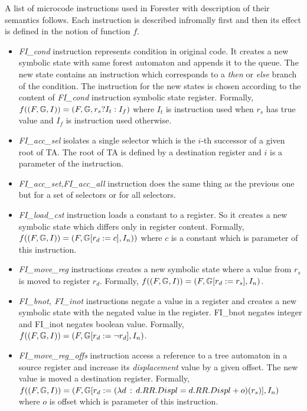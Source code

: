 A list of microcode instructions used in Forester with description
of their semantics follows.
Each instruction is described infromally first and then its effect is defined
in the notion of function $f$.
\begin{itemize}
	\item \emph{FI\_cond} instruction represents condition in original code.
		It creates a new symbolic state with same forest automaton and appends
		it to the queue.
		The new state contains an instruction which corresponds to a \textit{then}
		or \textit{else} branch of the condition.
		The instruction for the new states is chosen according to
		the content of \emph{FI\_cond} instruction symbolic state register.
		Formally, $f((F, \mathbb{G}, I)) = (F, \mathbb{G}, r_s ? I_t : I_f)$
		where $I_t$ is instruction used when $r_s$ has true value and
		$I_f$ is instruction used otherwise.
	\item \emph{FI\_acc\_sel} isolates a single selector which is the $i$-th
		successor of a given root of TA. The root of TA is defined by a destination
		register and $i$ is a parameter of the instruction.
	\item \emph{FI\_acc\_set,FI\_acc\_all} instruction does the same thing as the previous one
		but for a set of selectors or for all selectors.
	\item \emph{FI\_load\_cst} instruction loads a constant to a register.
		So it creates a new symbolic state which differs only in register content.
		Formally, $f((F, \mathbb{G}, I)) = (F, \mathbb{G} [r_d := c], I_n))$ where
		$c$ is a constant which is parameter of this instruction.
	\item \emph{FI\_move\_reg} instructions creates a new symbolic state where
		a value from $r_s$ is moved to register $r_d$.
		Formally, $f((F, \mathbb{G}, I)) = (F, \mathbb{G} [r_d := r_s], I_n)$.
	\item \emph{FI\_bnot, FI\_inot} instructions negate a value in a register and
		creates a new symbolic state with the negated value in the register.
		FI\_bnot negates integer and FI\_inot negates boolean value.
		Formally, $f((F, \mathbb{G}, I)) = (F, \mathbb{G} [r_d := \neg r_d], I_n)$.
	\item \emph{FI\_move\_reg\_offs} instruction access a reference to a tree automaton
		in a source register and increase its \emph{displacement} value by a given offset.
		The new value is moved a destination register.
		Formally, $f((F, \mathbb{G}, I)) = (F, \mathbb{G} [r_d := (\lambda d \,:\, d.RR.Displ = d.RR.Displ + o)(r_s)], I_n)$
		where $o$ is offset which is parameter of this instruction.

\end{itemize}
